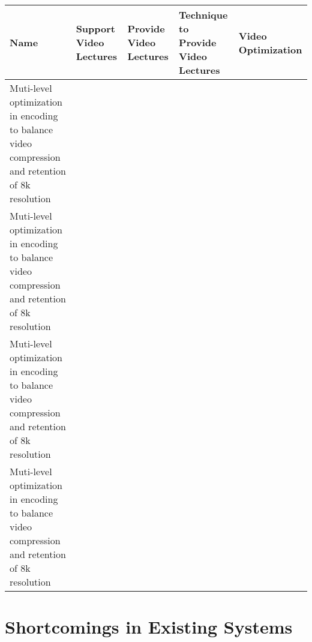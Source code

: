\begin{sideways}
\centering
\begin{tabularx}{1.5\textwidth} { 
  | >{\raggedright\arraybackslash}X 
  | >{\centering\arraybackslash}X | >{\centering\arraybackslash}X | >{\centering\arraybackslash}X | >{\raggedleft\arraybackslash}X | }
 \hline
\bfseries{Name} & \bfseries{Support Video Lectures} &\bfseries{Provide Video Lectures} &\bfseries{Technique to Provide Video Lectures} & \bfseries{Video Optimization}  \\
\hline
Muti-level optimization in encoding to balance video compression and retention of 8k resolution
&
&
&
&
\\
\hline
Muti-level optimization in encoding to balance video compression and retention of 8k resolution
&
&
&
&
\\
\hline

Muti-level optimization in encoding to balance video compression and retention of 8k resolution
&
&
&
&
\\
\hline

Muti-level optimization in encoding to balance video compression and retention of 8k resolution
&
&
&
&
\\
\hline



\end{tabularx}
\end{sideways}

\section{Shortcomings in Existing Systems}





